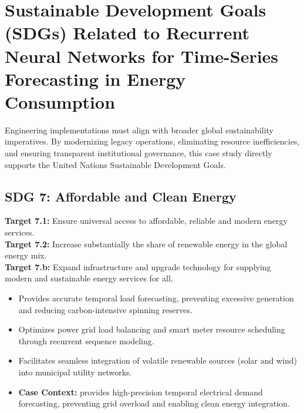 \section{Sustainable Development Goals (SDGs) Related to Recurrent Neural Networks for Time-Series Forecasting in Energy Consumption}
Engineering implementations must align with broader global sustainability imperatives. By modernizing legacy operations, eliminating resource inefficiencies, and ensuring transparent institutional governance, this case study directly supports the United Nations Sustainable Development Goals.

\subsection{SDG 7: Affordable and Clean Energy}
\noindent\textbf{Target 7.1:} Ensure universal access to affordable, reliable and modern energy services. \\
\noindent\textbf{Target 7.2:} Increase substantially the share of renewable energy in the global energy mix. \\
\noindent\textbf{Target 7.b:} Expand infrastructure and upgrade technology for supplying modern and sustainable energy services for all.
\begin{itemize}
  \item Provides accurate temporal load forecasting, preventing excessive generation and reducing carbon-intensive spinning reserves.
  \item Optimizes power grid load balancing and smart meter resource scheduling through recurrent sequence modeling.
  \item Facilitates seamless integration of volatile renewable sources (solar and wind) into municipal utility networks.
  \item \textbf{Case Context:} provides high-precision temporal electrical demand forecasting, preventing grid overload and enabling clean energy integration.
\end{itemize}

